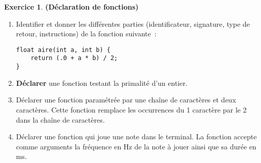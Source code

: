 \documentclass[12pt]{article}
\theoremstyle{definition}
\newtheorem{Exercice}{Exercice}
\begin{document}
\begin{Exercice} {\bf (Déclaration de fonctions)}\smallskip

\begin{enumerate}
    \item Identifier et donner les différentes parties
    (identificateur, signature, type de retour, instructions) de la
    fonction suivante~:
    \begin{lstlisting}
float aire(int a, int b) {
    return (.0 + a * b) / 2;
}
    \end{lstlisting}
    \smallskip

    \item {\bf Déclarer} une fonction testant la primalité d'un entier.
    \smallskip

    \item Déclarer une fonction paramétrée par une chaîne de caractères
    et deux caractères. Cette fonction remplace les occurrences du
    1\ier{} caractère par le 2\ieme{} dans la chaîne de caractères.
    \smallskip

    \item Déclarer une fonction qui joue une note dans le terminal.
    La fonction accepte comme arguments la fréquence en Hz de
    la note à jouer ainsi que sa durée en ms.
\end{enumerate}
\end{Exercice}
\bigskip
\end{document}
